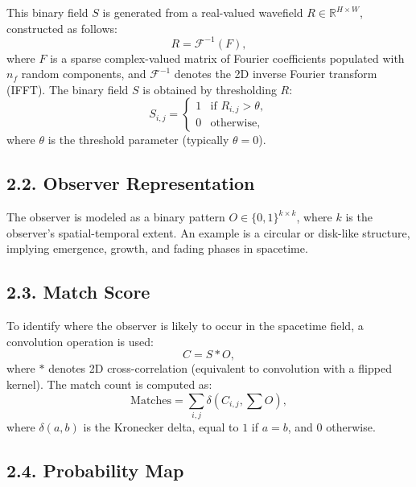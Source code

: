 \documentclass[11pt]{article}
\begin{document}
This binary field $S$ is generated from a real-valued wavefield $R \in \mathbb{R}^{H \times W}$, constructed as follows:
\begin{equation}
    R = \mathcal{F}^{-1}(F),
\end{equation}
where $F$ is a sparse complex-valued matrix of Fourier coefficients populated with $n_f$ random components, and $\mathcal{F}^{-1}$ denotes the 2D inverse Fourier transform (IFFT). The binary field $S$ is obtained by thresholding $R$:
\begin{equation}
    S_{i,j} =
    \begin{cases}
        1 & \text{if } R_{i,j} > \theta, \\
        0 & \text{otherwise},
    \end{cases}
\end{equation}
where $\theta$ is the threshold parameter (typically $\theta = 0$).

\subsection*{2.2. Observer Representation}

The observer is modeled as a binary pattern $O \in \{0,1\}^{k \times k}$, where $k$ is the observer's spatial-temporal extent. An example
is a circular or disk-like structure, implying emergence, growth, and fading phases in spacetime.

\subsection*{2.3. Match Score}

To identify where the observer is likely to occur in the spacetime field, a convolution operation is used:
\begin{equation}
    C = S \ast O,
\end{equation}
where $\ast$ denotes 2D cross-correlation (equivalent to convolution with a flipped kernel). The match count is computed as:
\begin{equation}
    \text{Matches} = \sum_{i,j} \delta(C_{i,j}, \sum O),
\end{equation}
where $\delta(a,b)$ is the Kronecker delta, equal to $1$ if $a = b$, and $0$ otherwise.

\subsection*{2.4. Probability Map}
\end{document}
